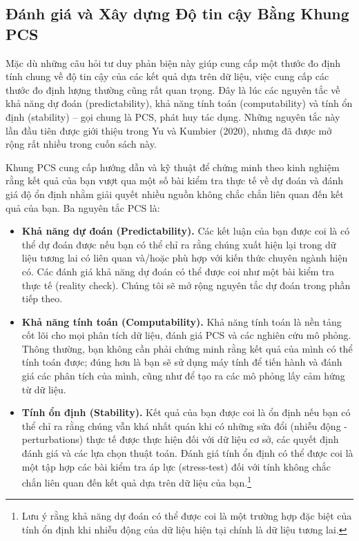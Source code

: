 \subsection{Đánh giá và Xây dựng Độ tin cậy Bằng Khung PCS}

Mặc dù những câu hỏi tư duy phản biện này giúp cung cấp một thước đo định tính chung về độ tin cậy của các kết quả dựa trên dữ liệu, việc cung cấp các thước đo định lượng thường cũng rất quan trọng. Đây là lúc các nguyên tắc về khả năng dự đoán (predictability), khả năng tính toán (computability) và tính ổn định (stability) – gọi chung là PCS, phát huy tác dụng. Những nguyên tắc này lần đầu tiên được giới thiệu trong Yu và Kumbier (2020), nhưng đã được mở rộng rất nhiều trong cuốn sách này.

Khung PCS cung cấp hướng dẫn và kỹ thuật để chứng minh theo kinh nghiệm rằng kết quả của bạn vượt qua một số bài kiểm tra thực tế về dự đoán và đánh giá độ ổn định nhằm giải quyết nhiều nguồn không chắc chắn liên quan đến kết quả của bạn. Ba nguyên tắc PCS là:

\begin{itemize}
    \item \textbf{Khả năng dự đoán (Predictability).} Các kết luận của bạn được coi là có thể dự đoán được nếu bạn có thể chỉ ra rằng chúng xuất hiện lại trong dữ liệu tương lai có liên quan và/hoặc phù hợp với kiến thức chuyên ngành hiện có. Các đánh giá khả năng dự đoán có thể được coi như một bài kiểm tra thực tế (reality check). Chúng tôi sẽ mở rộng nguyên tắc dự đoán trong phần tiếp theo.
    \item \textbf{Khả năng tính toán (Computability).} Khả năng tính toán là nền tảng cốt lõi cho mọi phân tích dữ liệu, đánh giá PCS và các nghiên cứu mô phỏng. Thông thường, bạn không cần phải chứng minh rằng kết quả của mình có thể tính toán được; đúng hơn là bạn sẽ sử dụng máy tính để tiến hành và đánh giá các phân tích của mình, cũng như để tạo ra các mô phỏng lấy cảm hứng từ dữ liệu.
    \item \textbf{Tính ổn định (Stability).} Kết quả của bạn được coi là ổn định nếu bạn có thể chỉ ra rằng chúng vẫn khá nhất quán khi có những sửa đổi (nhiễu động - perturbations) thực tế được thực hiện đối với dữ liệu cơ sở, các quyết định đánh giá và các lựa chọn thuật toán. Đánh giá tính ổn định có thể được coi là một tập hợp các bài kiểm tra áp lực (stress-test) đối với tính không chắc chắn liên quan đến kết quả dựa trên dữ liệu của bạn.\footnote{Lưu ý rằng khả năng dự đoán có thể được coi là một trường hợp đặc biệt của tính ổn định khi nhiễu động của dữ liệu hiện tại chính là dữ liệu tương lai.}
\end{itemize}

